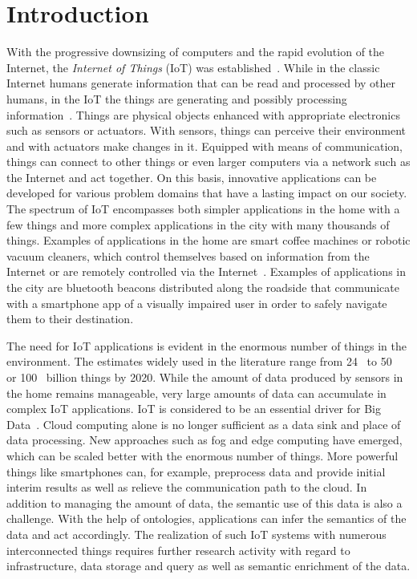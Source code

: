 \documentclass[english,version-2019-11]{uzl-thesis}
\begin{document}

\chapter{Introduction}
With the progressive downsizing of computers and the rapid evolution of
the Internet, the \emph{Internet of Things} (IoT) was established~\cite{AndreasTeubler}.
While in the classic Internet humans generate information that can 
be read and processed by other humans, in the IoT the things
are generating and possibly processing information~\cite{AITScript}.
Things are physical objects enhanced with appropriate electronics
such as sensors or actuators. With sensors, things can perceive
their environment and with actuators make changes in it.
Equipped with means of communication, things can connect to other things
or even larger computers via a network such as the Internet and
act together. On this basis, innovative applications can be developed
for various problem domains that have a lasting impact on our society.
The spectrum of IoT encompasses both simpler applications in the home
with a few things and more complex applications in the city with many
thousands of things. Examples of applications in the home are smart coffee machines or robotic vacuum cleaners, which control
themselves based on information from the Internet or are remotely
controlled via the Internet~\cite{AndreasTeubler}. Examples of applications in the city are
bluetooth beacons distributed along the roadside that communicate
with a smartphone app of a visually impaired user in order to safely
navigate them to their destination.

The need for IoT applications is evident in the enormous number of things
in the environment. 
The estimates widely used in the literature range from
24~\cite{RoutingIssuesSurvey} to 50~\cite{IoTEvolution} or 100~\cite{SimChallenges} billion things by 2020. 
While the amount of data
produced by sensors in the home remains manageable,
very large amounts of data can accumulate in complex IoT applications.
IoT is considered to be an essential driver for Big Data~\cite{IoTSim}. 
Cloud computing alone is no longer sufficient as a data sink
and place of data processing. New approaches such as fog and edge computing
have emerged, which can be scaled better with the enormous number of things.
More powerful things like smartphones can, for example, preprocess
data and provide initial interim results as well as
relieve the communication path to the cloud.
In addition to managing the amount of data, the semantic use of this data
is also a challenge. With the help of ontologies, applications can infer
the semantics of the data and act accordingly. The realization of such
IoT systems with numerous interconnected things requires further research
activity with regard to infrastructure, data storage and query as well
as semantic enrichment of the data.
\end{document}
